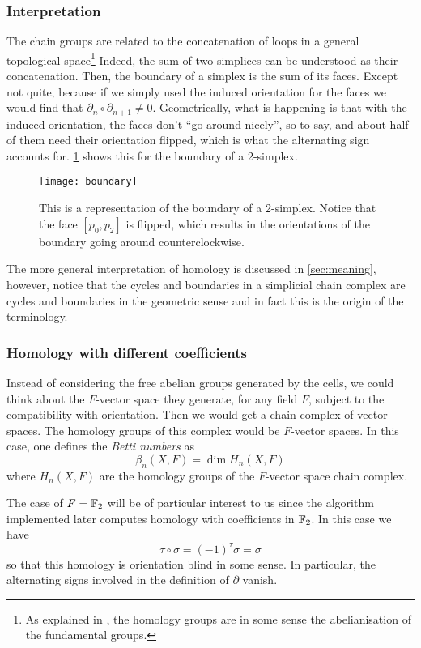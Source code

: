 \documentclass[../main.tex]{subfiles}
\begin{document}
\subsubsection{Interpretation}
The chain groups are related to the concatenation of loops in a general topological
space\footnote{As explained in \cite{hatcher}, the homology groups are in some sense the
abelianisation of the fundamental groups.} Indeed, the sum of two simplices can be
understood as their concatenation. Then, the boundary of a simplex is the sum of its
faces. Except not quite, because if we simply used the induced orientation for the faces
we would find that \( \partial_{n} \circ \partial_{n+1} \neq 0 \). Geometrically, what is
happening is that with the induced orientation, the faces don't ``go around nicely'', so
to say, and about half of them need their orientation flipped, which is what the
alternating sign accounts for. \cref{fig:boundary} shows this for the boundary of a
2-simplex.
\begin{figure}[htb]
	\centering
	\texttt{[image: boundary]}
	\caption{This is a representation of the boundary of a 2-simplex. Notice that the face
		\( [p_0, p_2] \) is flipped, which results in the orientations of the boundary going
	around counterclockwise.}
	\label{fig:boundary}
\end{figure}
The more general interpretation of homology is discussed in \cref{sec:meaning}, however,
notice that the cycles and boundaries in a simplicial chain complex are cycles and
boundaries in the geometric sense and in fact this is the origin of the terminology. 

\subsubsection{Homology with different coefficients} \label{sec:different coefficients}
Instead of considering the free abelian groups generated by the cells, we could think
about the \( F \)-vector space they generate, for any field \( F \), subject to the
compatibility with orientation. Then we would get a chain complex of vector spaces. The
homology groups of this complex would be \( F \)-vector spaces. In this case, one defines
the \emph{Betti numbers} as
\begin{equation*}
	\beta_n(X, F) = \dim H_n(X, F)
\end{equation*}
where \( H_n(X, F) \) are the homology groups of the \( F \)-vector space chain
complex. 

The case of \( F = \mathbb{F}_2 \) will be of particular interest to us since the algorithm
implemented later computes homology with coefficients in \( \mathbb{F}_2 \). In this case we have
\begin{equation*}
	\tau \circ \sigma = (-1)^\tau \sigma = \sigma
\end{equation*}
so that this homology is orientation blind in some sense. In particular, the alternating
signs involved in the definition of \( \partial \) vanish. 
\end{document}
